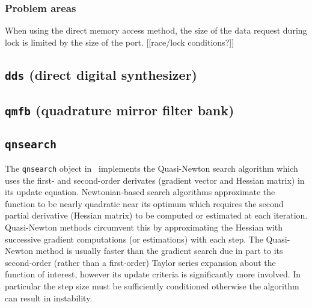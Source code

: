 \subsubsection{Problem areas}
When using the direct memory access method, the size of the data request
during lock is limited by the size of the port.
[[race/lock conditions?]]


%
%

\subsection{{\tt dds} (direct digital synthesizer)}

\subsection{{\tt qmfb} (quadrature mirror filter bank)}

%
%

\subsection{{\tt qnsearch} }
\label{module:experimental:qnsearch}
The {\tt qnsearch} object in \liquid\ implements the
Quasi-Newton search algorithm which uses the first- and second-order
derivates (gradient vector and Hessian matrix) in its update equation.
Newtonian-based search algorithms approximate the function to be nearly
quadratic near its optimum which requires the second partial derivative
(Hessian matrix) to be computed or estimated at each iteration.
Quasi-Newton methods circumvent this by approximating the Hessian with
successive gradient computations (or estimations) with each step.
The Quasi-Newton method is usually faster than the gradient search due
in part to its second-order (rather than a first-order) Taylor series
expansion about the function of interest,
however its update criteria is significantly more involved.
In particular the step size %
must be sufficiently conditioned
otherwise the algorithm can result in instability.


